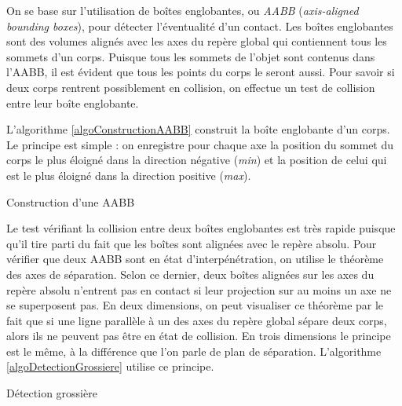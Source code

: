 On se base sur l'utilisation de boîtes englobantes, ou \textit{AABB}
(\textit{axis-aligned bounding boxes}), pour détecter l'éventualité
d'un contact. Les boîtes englobantes sont des volumes alignés avec les
axes du repère global qui contiennent tous les sommets d'un
corps. Puisque tous les sommets de l'objet sont contenus dans l'AABB,
il est évident que tous les points du corps le seront aussi. Pour
savoir si deux corps rentrent possiblement en collision, on effectue
un test de collision entre leur boîte englobante.

L'algorithme \ref{algoConstructionAABB} construit la boîte englobante
d'un corps. Le principe est simple : on enregistre pour chaque axe la
position du sommet du corps le plus éloigné dans la direction négative
(\textit{min}) et la position de celui qui est le plus éloigné dans la
direction positive (\textit{max}).

\begin{algorithm}[h]
  \caption{Construction d'une AABB}
  \label{algoConstructionAABB}
  \dontprintsemicolon
  \BlankLine
  \BlankLine
  \BlankLine
\end{algorithm}

Le test vérifiant la collision entre deux boîtes englobantes est très
rapide puisque qu'il tire parti du fait que les boîtes sont alignées
avec le repère absolu. Pour vérifier que deux AABB sont en état
d'interpénétration, on utilise le théorème des axes de séparation.
Selon ce dernier, deux boîtes alignées sur les axes du repère absolu
n'entrent pas en contact si leur projection sur au moins un axe ne se
superposent pas. En deux dimensions, on peut visualiser ce théorème
par le fait que si une ligne parallèle à un des axes du repère global
sépare deux corps, alors ils ne peuvent pas être en état de
collision. En trois dimensions le principe est le même, à la
différence que l'on parle de plan de séparation. L'algorithme
\ref{algoDetectionGrossiere} utilise ce principe.

\begin{algorithm}[h]
  \caption{Détection grossière}
  \label{algoDetectionGrossiere}
  \dontprintsemicolon
  \BlankLine
\end{algorithm}

